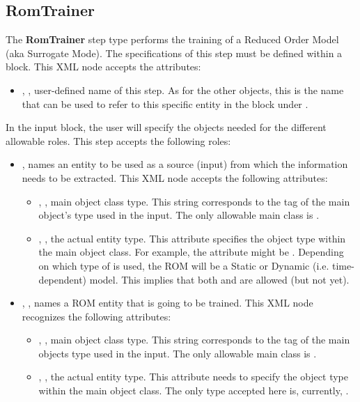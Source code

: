 \subsection{RomTrainer}
\label{subsec:stepRomTrainer}
The \textbf{RomTrainer} step type performs the training of a Reduced Order
Model (aka Surrogate Mode).
%
The specifications of this step must be defined within a 
block.
%
This XML node accepts the attributes:
\vspace{-5mm}
\begin{itemize}
\itemsep0em
\item {}, , user-defined name of
this step.
\nb As for the other objects, this is the name that can be used to refer to this
specific entity in the  block under .
\end{itemize}
\vspace{-5mm}
In the  input block, the user will specify the objects
needed for the different allowable roles.
%
This step accepts the following roles:
\begin{itemize}
\item {},  names an entity to
be used as a source (input) from which the information needs to be extracted.
This XML node accepts the following attributes:
  \begin{itemize}
  \item {}, , main object class
    type.
    This string corresponds to the tag of the main object's type used in the
    input.
    The only allowable main class is .
  \item {}, , the actual entity
    type.
    This attribute specifies the object type within the main object class.
    For example, the  attribute might be .
    \nb Depending on which type of  is used, the ROM
    will be a Static or Dynamic (i.e. time-dependent) model. This implies that
    both  and  are allowed (but not
     yet).
  \end{itemize}
\item {}, , names a ROM entity
  that is going to be trained.
  This XML node recognizes the following attributes:
  \begin{itemize}
  \item {}, , main object class
    type.
    This string corresponds to the tag of the main objects type used in the
    input.
    The only allowable main class is .
  \item {}, , the actual entity
    type.
    This attribute needs to specify the object type within the main object
    class.
    The only type accepted here is, currently, .
  \end{itemize}
\end{itemize}

